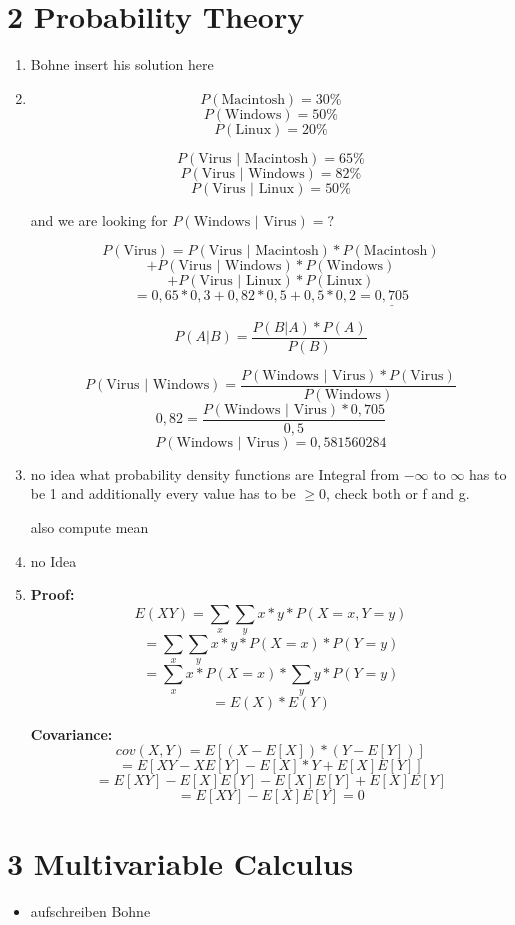 \documentclass[12pt]{article}
\begin{document}
\section*{2 Probability Theory}
\begin{enumerate}[1)]
    \item 
        Bohne insert his solution here
        
    \item
        $$ P(\text{Macintosh}) = 30\% $$
        $$ P(\text{Windows})= 50\% $$
        $$ P(\text{Linux})= 20\% $$

        $$ P( \text{Virus } \vert \text{ Macintosh}) = 65\% $$
        $$ P( \text{Virus } \vert \text{ Windows}) = 82\% $$
        $$ P( \text{Virus } \vert \text{ Linux}) = 50\% $$

        and we are looking for $P(\text{Windows } \vert \text{ Virus}) = \text{?}$

        $$ P( \text{Virus}) = P( \text{Virus } \vert \text{ Macintosh}) * P( \text{Macintosh}) $$
        $$+ P( \text{Virus } \vert \text{ Windows}) * P( \text{Windows}) $$
        $$+ P( \text{Virus } \vert \text{ Linux}) * P( \text{Linux}) $$
        $$ = 0,65*0,3 + 0,82*0,5 + 0,5 * 0,2 = \underline{0,705} $$

        $$ P(A \vert B) = \frac{P(B \vert A) * P(A)}{P(B)} $$

        $$ P( \text{Virus } \vert \text{ Windows}) = \frac{ P( \text{Windows } \vert \text{ Virus}) * P( \text{Virus})}{P( \text{Windows})} $$
        $$ 0,82 = \frac{ P( \text{Windows } \vert \text{ Virus}) * 0,705}{0,5}$$
        $$ P( \text{Windows } \vert \text{ Virus}) = 0,581560284 $$

    \item
        no idea what probability density functions are
        Integral from $- \infty$ to $\infty$ has to be 1 and additionally every value has to be $\geq 0$, check both or f and g.

        also compute mean

    \item
        no Idea

    \item
        \textbf{Proof:}\\
        $$ E( X Y ) = \sum_x \sum_y x * y * P(X=x, Y=y) $$
        $$ = \sum_x \sum_y x * y * P(X=x) * P(Y=y)$$
        $$ = \sum_x  x * P(X=x) * \sum_y y * P(Y=y)$$
        $$ = E(X) * E(Y)$$

        \textbf{Covariance:}\\
        $$ cov(X,Y) = E[(X - E[X]) * (Y - E[Y])] $$
        $$ = E[XY - X E[Y] - E[X]*Y + E[X]E[Y]]$$
        $$ = E[XY] - E[X]E[Y] - E[X]E[Y] + E[X]E[Y]$$
        $$ = E[XY] - E[X]E[Y] = 0$$

                
\end{enumerate}



\newpage
\section*{3 Multivariable Calculus}

\begin{itemize}
    \item 
        aufschreiben Bohne
\end{itemize}
\end{document}
